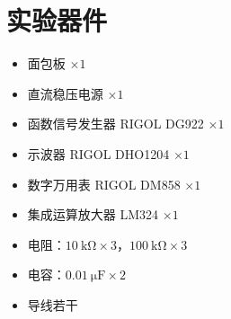 \documentclass[12pt]{ctexart}
\begin{document}
\section{实验器件}

\begin{itemize}
    \item 面包板 $\times 1$
    \item 直流稳压电源 $\times 1$
    \item 函数信号发生器 RIGOL DG922 $\times 1$
    \item 示波器 RIGOL DHO1204 $\times 1$
    \item 数字万用表 RIGOL DM858 $\times 1$
    \item 集成运算放大器 LM324 $\times 1$
    \item 电阻：$\SI{10}{\kilo\ohm} \times 3$，$\SI{100}{\kilo\ohm} \times 3$
    \item 电容：$\SI{0.01}{\micro\farad} \times 2$
    \item 导线若干
\end{itemize}
\end{document}
